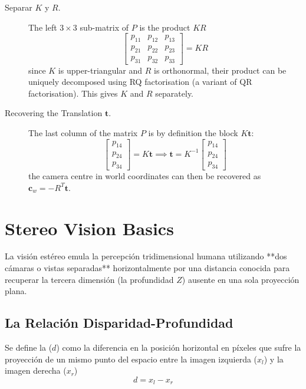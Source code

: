 \begin{description}
    \item[Separar $K$ y $R$.] The left $3 \times 3$ sub-matrix of $P$ is the product $KR$
    \begin{equation*}
        \begin{bmatrix} p_{11} & p_{12} & p_{13} \\ p_{21} & p_{22} & p_{23} \\ p_{31} & p_{32} & p_{33} \end{bmatrix} = KR
    \end{equation*}
    since $K$ is upper-triangular and $R$ is orthonormal, their product can be uniquely decomposed using RQ factorisation (a variant of QR factorisation). This gives $K$ and $R$ separately.
    \item[Recovering the Translation $\mathbf{t}$.] The last column of the matrix $P$ is by definition the block $K\mathbf{t}$:
    \begin{equation*}
        \begin{bmatrix} p_{14} \\ p_{24} \\ p_{34} \end{bmatrix} = K\mathbf{t} \implies \mathbf{t} = K^{-1} \begin{bmatrix} p_{14} \\ p_{24} \\ p_{34} \end{bmatrix}
    \end{equation*}
    the camera centre in world coordinates can then be recovered as $\mathbf{c}_w = -R^T \mathbf{t}$.
\end{description}

\section{Stereo Vision Basics}
La visión estéreo emula la percepción tridimensional humana utilizando **dos cámaras o vistas separadas** horizontalmente por una distancia conocida para recuperar la tercera dimensión (la profundidad $Z$) ausente en una sola proyección plana.

\subsection{La Relación Disparidad-Profundidad}
\begin{definicion}
    Se define la  ($d$) como la diferencia en la posición horizontal en píxeles que sufre la proyección de un mismo punto del espacio entre la imagen izquierda ($x_l$) y la imagen derecha ($x_r$)
    $$d = x_l - x_r$$
\end{definicion}

